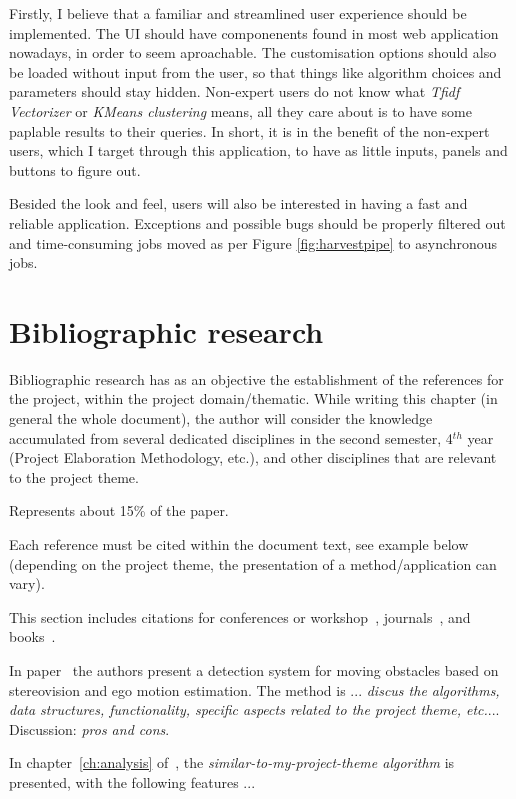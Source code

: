 \documentclass[12pt,a4paper,twoside]{report}
\begin{document}
Firstly, I believe that a familiar and streamlined user experience should be implemented. The UI should have componenents found in most web application nowadays, in order to seem aproachable. The customisation options should also be loaded without input from the user, so that things like algorithm choices and parameters should stay hidden. Non-expert users do not know what \emph{Tfidf Vectorizer} or \emph{KMeans clustering} means, all they care about is to have some paplable results to their queries. In short, it is in the benefit of the non-expert users, which I target through this application, to have as little inputs, panels and buttons to figure out.

Besided the look and feel, users will also be interested in having a fast and reliable application. Exceptions and possible bugs should be properly filtered out and time-consuming jobs moved as per Figure \ref{fig:harvestpipe} to asynchronous jobs.

\chapter{Bibliographic research}


Bibliographic research has as an objective the establishment of the references for the project, within the project domain/thematic. While writing this chapter (in general the whole document), the author will consider the knowledge accumulated from several dedicated disciplines in the second semester, 4$^{th}$ year (Project Elaboration Methodology, etc.), and other disciplines that are relevant to the project theme.

Represents about 15\% of the paper.

Each reference must be cited within the document text, see example below (depending on the project theme, the presentation of a method/application can vary).


This section includes citations for conferences or workshop~\cite{BellucciLZ04}, journals~\cite{AntoniouSBDB07}, 
and books~\cite{russell1995artificial}. 

In paper~\cite{AntoniouSBDB07} the authors present a detection system for moving obstacles based on stereovision and ego motion estimation. 
The method is ... {\it discus the algorithms, data structures, functionality, specific aspects related to the project theme, etc.}... Discussion: {\it pros and cons}.

In chapter~\ref{ch:analysis} of~\cite{strunk}, the {\it similar-to-my-project-theme algorithm} is presented, with the following features ...
\end{document}
